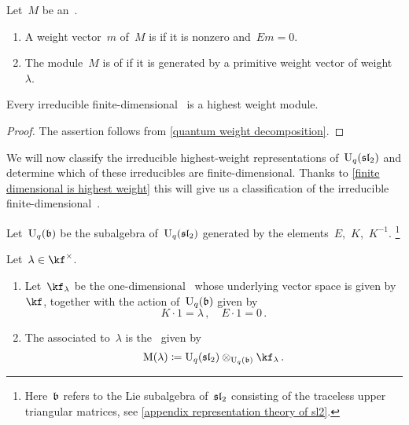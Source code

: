 \documentclass[a4paper, 11pt, oneside]{scrartcl}
\begin{document}
\begin{definition}
  Let~$M$ be an~.
  \begin{enumerate}
    \item
      A weight vector~$m$ of~$M$ is  if it is nonzero and~$Em = 0$.
    \item
      The module~$M$ is of  if it is generated by a primitive weight vector of weight~$\lambda$.
  \end{enumerate}
\end{definition}

\begin{proposition}
  \label{finite dimensional is highest weight}
  Every irreducible finite-dimensional~ is a highest weight module.
\end{proposition}

\begin{proof}
  The assertion follows from \cref{quantum weight decomposition}.
\end{proof}

We will now classify the irreducible highest-weight representations of~$\operatorname{U}_q(\mathfrak{sl}_2)$ and determine which of these irreducibles are finite-dimensional.
Thanks to \cref{finite dimensional is highest weight} this will give us a classification of the irreducible finite-dimensional~.

\begin{definition}
  Let~$\operatorname{U}_q(\mathfrak{b})$ be the subalgebra of~$\operatorname{U}_q(\mathfrak{sl}_2)$ generated by the elements~$E$,~$K$,~$K^{-1}$.%
  \footnote{
    Here~$\mathfrak{b}$ refers to the Lie subalgebra of~$\mathfrak{sl}_2$ consisting of the traceless upper triangular matrices, see \cref{appendix representation theory of sl2}.
  }
\end{definition}

\begin{definition}
  Let~$\lambda \in \kf^\times$.
  \begin{enumerate}
    \item
      Let~$\kf_\lambda$ be the one-dimensional~ whose underlying vector space is given by~$\kf$, together with the action of~$\operatorname{U}_q(\mathfrak{b})$ given by
      \[
        K \cdot 1 = \lambda \,,
        \quad
        E \cdot 1 = 0 \,.
      \]
    \item
      The  associated to~$\lambda$ is the~ given by
      \[
        \verma(\lambda)
        \defined
        \Univ_q(\sllie_2) \tensor_{\Univ_q(\blie)} \kf_\lambda \,.
      \]
  \end{enumerate}
\end{definition}
\end{document}
